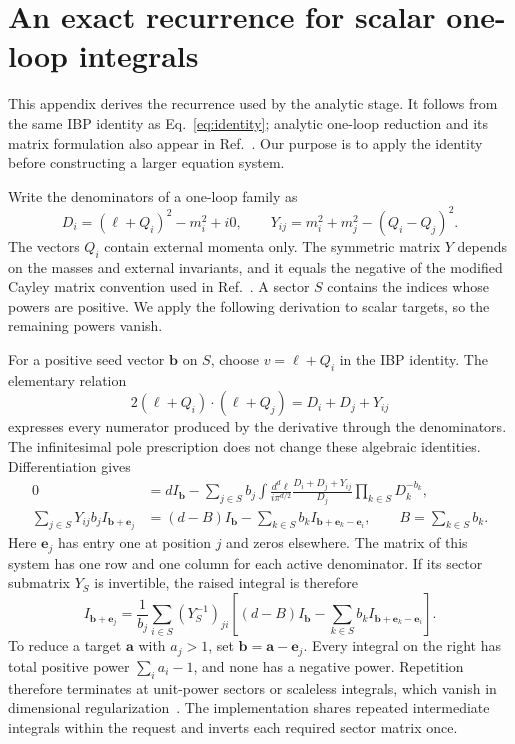\section{An exact recurrence for scalar one-loop integrals}
\label{app:analytic-decomposition}
This appendix derives the recurrence used by the analytic stage. It follows from the same IBP identity as Eq.~\eqref{eq:identity}; analytic one-loop reduction and its matrix formulation also appear in Ref.~\cite{Hu2025}. Our purpose is to apply the identity before constructing a larger equation system.

Write the denominators of a one-loop family as
\begin{equation}
 D_i=(\ell+Q_i)^2-m_i^2+i0,\qquad
 Y_{ij}=m_i^2+m_j^2-(Q_i-Q_j)^2.
 \label{eq:analytic-y}
\end{equation}
The vectors $Q_i$ contain external momenta only. The symmetric matrix $Y$ depends on the masses and external invariants, and it equals the negative of the modified Cayley matrix convention used in Ref.~\cite{Hu2025}. A sector $S$ contains the indices whose powers are positive. We apply the following derivation to scalar targets, so the remaining powers vanish.

For a positive seed vector $\boldsymbol b$ on $S$, choose $v=\ell+Q_i$ in the IBP identity. The elementary relation
\begin{equation}
 2(\ell+Q_i)\cdot(\ell+Q_j)=D_i+D_j+Y_{ij}
 \label{eq:analytic-dot}
\end{equation}
expresses every numerator produced by the derivative through the denominators. The infinitesimal pole prescription does not change these algebraic identities. Differentiation gives
\begin{align}
0&=d I_{\boldsymbol b}
 -\sum_{j\in S}b_j\int\frac{d^d\ell}{i\pi^{d/2}}
 \frac{D_i+D_j+Y_{ij}}{D_j}\prod_{k\in S}D_k^{-b_k},\\
\sum_{j\in S}Y_{ij}b_j I_{\boldsymbol b+\boldsymbol e_j}
 &= (d-B)I_{\boldsymbol b}
 -\sum_{k\in S}b_k I_{\boldsymbol b+\boldsymbol e_k-\boldsymbol e_i},
 \qquad B=\sum_{k\in S}b_k.
 \label{eq:analytic-system}
\end{align}
Here $\boldsymbol e_j$ has entry one at position $j$ and zeros elsewhere. The matrix of this system has one row and one column for each active denominator. If its sector submatrix $Y_S$ is invertible, the raised integral is therefore
\begin{equation}
 I_{\boldsymbol b+\boldsymbol e_j}
 =\frac{1}{b_j}\sum_{i\in S}(Y_S^{-1})_{ji}
 \left[(d-B)I_{\boldsymbol b}
 -\sum_{k\in S}b_k I_{\boldsymbol b+\boldsymbol e_k-\boldsymbol e_i}\right].
 \label{eq:analytic-recurrence}
\end{equation}
To reduce a target $\boldsymbol a$ with $a_j>1$, set $\boldsymbol b=\boldsymbol a-\boldsymbol e_j$. Every integral on the right has total positive power $\sum_i a_i-1$, and none has a negative power. Repetition therefore terminates at unit-power sectors or scaleless integrals, which vanish in dimensional regularization~\cite{Weinzierl2022}. The implementation shares repeated intermediate integrals within the request and inverts each required sector matrix once.

